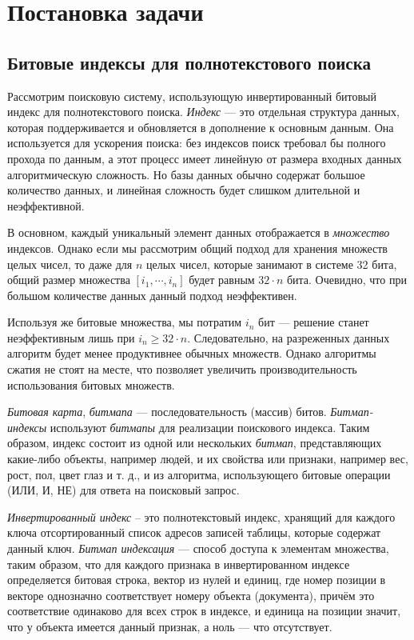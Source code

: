 \newpage
\section{Постановка задачи}

\subsection{Битовые индексы для полнотекстового поиска}

Рассмотрим поисковую систему, использующую инвертированный битовый индекс
для полнотекстового поиска. \textit{Индекс} — это отдельная структура данных,
которая поддерживается и обновляется в дополнение к основным данным.
Она используется для ускорения поиска: без индексов поиск требовал бы полного
прохода по данным, а этот процесс имеет линейную от размера входных данных
алгоритмическую сложность. Но базы данных обычно содержат большое количество
данных, и линейная сложность будет слишком длительной и неэффективной.

В основном, каждый уникальный элемент данных отображается в \textit{множество}
индексов. Однако если мы рассмотрим общий подход для хранения множеств целых
чисел, то даже для $n$ целых чисел, которые занимают в системе 32 бита, общий
размер множества $[i_1, \cdots, i_{n}]$ будет равным $32 \cdot n$ бита.
Очевидно, что при большом количестве данных данный подход неэффективен.

Используя же битовые множества, мы потратим $i_{n}$ бит — решение станет
неэффективным лишь при $i_{n} \ge 32 \cdot n $. Следовательно, на разреженных
данных алгоритм будет менее продуктивнее обычных множеств. Однако алгоритмы
сжатия не стоят на месте, что позволяет увеличить производительность использования
битовых множеств.

\textit{Битовая карта}, \textit{битмапа} — последовательность (массив) битов.
\textit{Битмап-индексы} используют \textit{битмапы} для реализации поискового
индекса. Таким образом, индекс состоит из одной или нескольких \textit{битмап},
представляющих какие-либо объекты, например людей, и их свойства
или признаки, например вес, рост, пол, цвет глаз и т. д., и из алгоритма,
использующего битовые операции (ИЛИ, И, НЕ) для ответа на поисковый запрос.

\textit{Инвертированный индекс} – это полнотекстовый индекс, хранящий для каждого
ключа отсортированный список адресов записей таблицы, которые содержат данный ключ.
\textit{Битмап индексация} — способ доступа к элементам множества, таким образом,
что для каждого признака в инвертированном индексе определяется битовая
строка, вектор из нулей и единиц, где номер позиции в векторе однозначно
соответствует номеру объекта (документа), причём это соответствие одинаково для
всех строк в индексе, и единица на позиции значит, что у объекта имеется данный 
признак, а ноль — что отсутствует.

